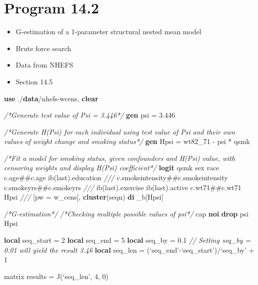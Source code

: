 \documentclass[
  10pt,
]{book}
\newenvironment{Shaded}{\begin{snugshade}}{\end{snugshade}}
\newcommand{\CommentTok}[1]{\textcolor[rgb]{0.56,0.35,0.01}{\textit{#1}}}
\newcommand{\FunctionTok}[1]{\textcolor[rgb]{0.00,0.00,0.00}{#1}}
\newcommand{\KeywordTok}[1]{\textcolor[rgb]{0.13,0.29,0.53}{\textbf{#1}}}
\newcommand{\NormalTok}[1]{#1}
\newcommand{\OtherTok}[1]{\textcolor[rgb]{0.56,0.35,0.01}{#1}}
\providecommand{\tightlist}{%
  \setlength{\itemsep}{0pt}\setlength{\parskip}{0pt}}
\begin{document}
\hypertarget{program-14.2}{%
\section{Program 14.2}\label{program-14.2}}

\begin{itemize}
\tightlist
\item
  G-estimation of a 1-parameter structural nested mean model
\item
  Brute force search
\item
  Data from NHEFS
\item
  Section 14.5
\end{itemize}

\begin{Shaded}
\begin{Highlighting}[]
\KeywordTok{use}\NormalTok{ ./}\KeywordTok{data}\NormalTok{/nhefs-wcens, }\KeywordTok{clear}

\CommentTok{/*Generate test value of Psi = 3.446*/}
\KeywordTok{gen}\NormalTok{ psi = 3.446}

\CommentTok{/*Generate H(Psi) for each individual using test value of Psi and their own values of weight change and smoking status*/}
\KeywordTok{gen}\NormalTok{ Hpsi = wt82_71 - psi * qsmk }

\CommentTok{/*Fit a model for smoking status, given confounders and H(Psi) value, with censoring weights and display H(Psi) coefficient*/}
\KeywordTok{logit}\NormalTok{ qsmk sex race c.age##c.age ib(}\FunctionTok{last}\NormalTok{).education }\CommentTok{///}
\NormalTok{  c.smokeintensity##c.smokeintensity c.smokeyrs##c.smokeyrs }\CommentTok{///}
\NormalTok{  ib(}\FunctionTok{last}\NormalTok{).exercise ib(}\FunctionTok{last}\NormalTok{).active c.wt71##c.wt71 Hpsi }\CommentTok{///}
\NormalTok{  [pw = w_cens], }\KeywordTok{cluster}\NormalTok{(seqn)}
\KeywordTok{di}\NormalTok{ _b[Hpsi]}

\CommentTok{/*G-estimation*/}
\CommentTok{/*Checking multiple possible values of psi*/}
\NormalTok{cap }\KeywordTok{noi} \KeywordTok{drop}\NormalTok{ psi Hpsi}

\KeywordTok{local}\NormalTok{ seq_start = 2}
\KeywordTok{local}\NormalTok{ seq_end = 5}
\KeywordTok{local}\NormalTok{ seq_by = 0.1 }\CommentTok{// Setting seq_by = 0.01 will yield the result 3.46}
\KeywordTok{local}\NormalTok{ seq_len = (}\OtherTok{`seq_end'}\NormalTok{-}\OtherTok{`seq_start'}\NormalTok{)/}\OtherTok{`seq_by'}\NormalTok{ + 1}
                 
\FunctionTok{matrix}\NormalTok{ results = }\FunctionTok{J}\NormalTok{(}\OtherTok{`seq_len'}\NormalTok{, 4, 0)}


\end{Highlighting}
\end{Shaded}
\end{document}
